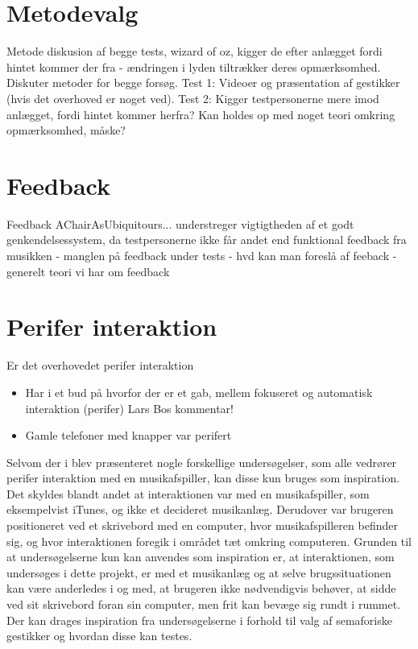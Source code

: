 \section{Metodevalg}
\label{DiskussionMetodevalg}
%
Metode diskusion af begge tests, wizard of oz, kigger de efter anlægget fordi hintet kommer der fra - ændringen i lyden tiltrækker deres opmærksomhed. 
Diskuter metoder for begge forsøg. Test 1: Videoer og præsentation af gestikker (hvis det overhoved er noget ved). Test 2: Kigger testpersonerne mere imod anlægget, fordi hintet kommer herfra? Kan holdes op med noget teori omkring opmærksomhed, måske?
%
\section{Feedback}
\label{DiskussionFeedback}
%
Feedback
AChairAsUbiquitours... understreger vigtigtheden af et godt genkendelsessystem, da testpersonerne ikke får andet end funktional feedback fra musikken - manglen på feedback under tests - hvd kan man foreslå af feeback - generelt teori vi har om feedback
% 
\section{Perifer interaktion}
\label{DiskussionPeriferInteraktion}
%
Er det overhovedet perifer interaktion
%



\begin{itemize}
  \item Har i et bud på hvorfor der er et gab, mellem fokuseret og automatisk interaktion (perifer) Lars Bos kommentar!
  \item Gamle telefoner med knapper var perifert
\end{itemize}
%
Selvom der i  blev præsenteret nogle forskellige undersøgelser, som alle vedrører perifer interaktion med en musikafspiller, kan disse kun bruges som inspiration. Det skyldes blandt andet at interaktionen var med en musikafspiller, som eksempelvist iTunes, og ikke et decideret musikanlæg. Derudover var brugeren positioneret ved et skrivebord med en computer, hvor musikafspilleren befinder sig, og hvor interaktionen foregik i området tæt omkring computeren. Grunden til at undersøgelserne kun kan anvendes som inspiration er, at interaktionen, som undersøges i dette projekt, er med et musikanlæg og at selve brugssituationen kan være anderledes i og med, at brugeren ikke nødvendigvis behøver, at sidde ved sit skrivebord foran sin computer, men frit kan bevæge sig rundt i rummet. Der kan drages inspiration fra undersøgelserne i forhold til valg af semaforiske gestikker og hvordan disse kan testes.\blankline
%



